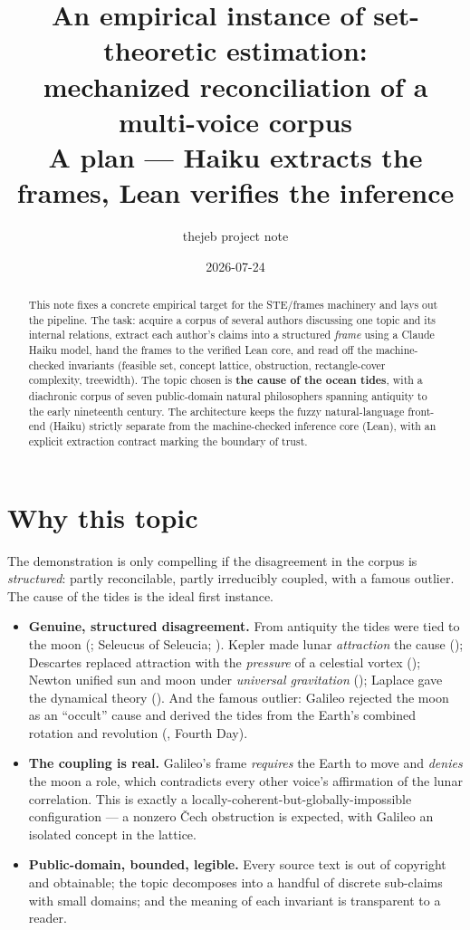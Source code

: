 \documentclass[11pt]{article}
\title{An empirical instance of set-theoretic estimation:\\
mechanized reconciliation of a multi-voice corpus\\
\large A plan --- Haiku extracts the frames, Lean verifies the inference}
\author{thejeb project note}
\date{2026-07-24}
\begin{document}
\maketitle

\begin{abstract}
This note fixes a concrete empirical target for the STE/frames machinery
and lays out the pipeline. The task: acquire a corpus of several authors
discussing one topic and its internal relations, extract each author's
claims into a structured \emph{frame} using a Claude Haiku model, hand the
frames to the verified Lean core, and read off the machine-checked
invariants (feasible set, concept lattice, obstruction, rectangle-cover
complexity, treewidth). The topic chosen is \textbf{the cause of the ocean
tides}, with a diachronic corpus of seven public-domain natural
philosophers spanning antiquity to the early nineteenth century. The
architecture keeps the fuzzy natural-language front-end (Haiku) strictly
separate from the machine-checked inference core (Lean), with an explicit
extraction contract marking the boundary of trust.
\end{abstract}

\section{Why this topic}

The demonstration is only compelling if the disagreement in the corpus is
\emph{structured}: partly reconcilable, partly irreducibly coupled, with a
famous outlier. The cause of the tides is the ideal first instance.

\begin{itemize}
\item \textbf{Genuine, structured disagreement.} From antiquity the tides
  were tied to the moon (\citealp{pliny77naturalis}; Seleucus of
  Seleucia; \citealp{bede725temporum}). Kepler made lunar
  \emph{attraction} the cause (\citealp{kepler1609astronomia}); Descartes
  replaced attraction with the \emph{pressure} of a celestial vortex
  (\citealp{descartes1644principia}); Newton unified sun and moon under
  \emph{universal gravitation} (\citealp{newton1687principia}); Laplace
  gave the dynamical theory (\citealp{laplace1799mecanique}). And the
  famous outlier: Galileo rejected the moon as an ``occult'' cause and
  derived the tides from the Earth's combined rotation and revolution
  (\citealp{galileo1632dialogue}, Fourth Day).
\item \textbf{The coupling is real.} Galileo's frame \emph{requires} the
  Earth to move and \emph{denies} the moon a role, which contradicts every
  other voice's affirmation of the lunar correlation. This is exactly a
  locally-coherent-but-globally-impossible configuration --- a nonzero
  Čech obstruction is expected, with Galileo an isolated concept in the
  lattice.
\item \textbf{Public-domain, bounded, legible.} Every source text is out
  of copyright and obtainable; the topic decomposes into a handful of
  discrete sub-claims with small domains; and the meaning of each invariant
  is transparent to a reader.
\end{itemize}
\end{document}
